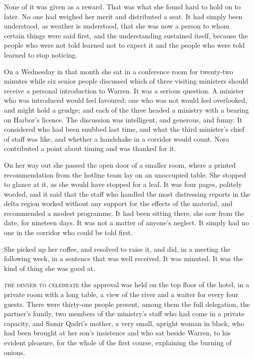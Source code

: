 None of it was given as a reward. That was what she found hard to hold on to later. No one had weighed her merit and distributed a seat. It had simply been understood, as weather is understood, that she was now a person to whom certain things were said first, and the understanding sustained itself, because the people who were not told learned not to expect it and the people who were told learned to stop noticing.

On a Wednesday in that month she sat in a conference room for twenty-two minutes while six senior people discussed which of three visiting ministers should receive a personal introduction to Warren. It was a serious question. A minister who was introduced would feel favoured; one who was not would feel overlooked, and might hold a grudge; and each of the three headed a ministry with a bearing on Harbor's licence. The discussion was intelligent, and generous, and funny. It considered who had been snubbed last time, and what the third minister's chief of staff was like, and whether a handshake in a corridor would count. Nora contributed a point about timing and was thanked for it.

On her way out she passed the open door of a smaller room, where a printed recommendation from the hotline team lay on an unoccupied table. She stopped to glance at it, as she would have stopped for a leaf. It was four pages, politely worded, and it said that the staff who handled the most distressing reports in the delta region worked without any support for the effects of the material, and recommended a modest programme. It had been sitting there, she saw from the date, for nineteen days. It was not a matter of anyone's neglect. It simply had no one in the corridor who could be told first.

She picked up her coffee, and resolved to raise it, and did, in a meeting the following week, in a sentence that was well received. It was minuted. It was the kind of thing she was good at.


\textsc{the dinner to celebrate} the approval was held on the top floor of the hotel, in a private room with a long table, a view of the river and a waiter for every four guests. There were thirty-one people present, among them the full delegation, the partner's family, two members of the ministry's staff who had come in a private capacity, and Samir Qadri's mother, a very small, upright woman in black, who had been brought at her son's insistence and who sat beside Warren, to his evident pleasure, for the whole of the first course, explaining the burning of onions.

